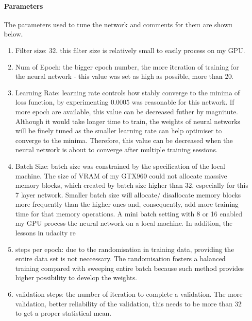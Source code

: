 \documentclass[paper=a4, fontsize=11pt]{scrartcl} %
\numberwithin{equation}{section} %
\numberwithin{figure}{section} %
\numberwithin{table}{section} %
\begin{document}
\begin{enumerate}
\begin{itemize}
{\paragraph{Parameters}\label{rubric20}
The parameters used to tune the network and comments for them are shown below.
\begin{enumerate}
	\item Filter size: 32. this filter size is relatively small to easily process on my GPU.
	\item Num of Epoch: the bigger epoch number, the more iteration of training for the neural network - this value was set as high as possible, more than 20.	
	\item Learning Rate: learning rate controls how stably converge to the minima of loss function, by experimenting 0.0005 was reasonable for this network. If more epoch are available, this value can be decreased futher by magnitute. Although it would take longer time to train, the weights of neural networks will be finely tuned as the smaller learning rate can help optimiser to converge to the minima. Therefore, this value can be decreased when the neural network is about to converge after multiple training sessions.
	\item Batch Size: batch size was constrained by the specification of the local machine. The size of VRAM of my GTX960 could not allocate massive memory blocks, which created by batch size higher than 32, especially for this 7 layer network. Smaller batch size will allocate/ disallocate memory blocks more frequently than the higher ones and, consequently, add more training time for that memory operations. A mini batch setting with 8 or 16 enabled my GPU process the neural network on a local machine. In addition, the lessons in udacity re
	\item steps per epoch: due to the randomisation in training data, providing the entire data set is not neccessary. The randomisation fosters a balanced training compared with sweeping entire batch because such method provides higher possibility to develop the weights.
	\item validation steps: the number of iteration to complete a validation. The more validation, better reliability of the validation, this needs to be more than 32 to get a proper statistical mean.
\end{enumerate}

}
\end{itemize}
\end{enumerate}
\end{document}
